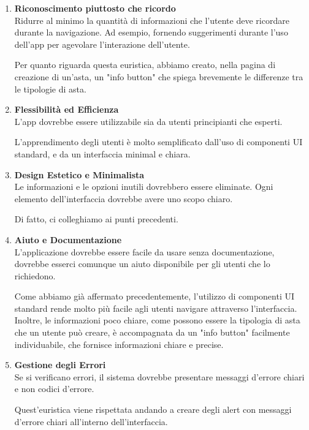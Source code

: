\begin{enumerate}
	\item \textbf{\sffamily Riconoscimento piuttosto che ricordo} \\
	      Ridurre al minimo la quantità di informazioni che l'utente deve ricordare durante la navigazione.
	      Ad esempio, fornendo suggerimenti durante l'uso dell'app per agevolare l'interazione dell'utente.

	      Per quanto riguarda questa euristica, abbiamo creato, nella pagina di creazione di un'asta, un "info button" che spiega brevemente le differenze tra le tipologie di asta.

	\item \textbf{\sffamily Flessibilità ed Efficienza} \\
	      L'app dovrebbe essere utilizzabile sia da utenti principianti che esperti.

	      L'apprendimento degli utenti è molto semplificato dall'uso di componenti UI standard, e da un interfaccia minimal e chiara.

	\item \textbf{\sffamily Design Estetico e Minimalista} \\
	      Le informazioni e le opzioni inutili dovrebbero essere eliminate.
	      Ogni elemento dell'interfaccia dovrebbe avere uno scopo chiaro.

	      Di fatto, ci colleghiamo ai punti precedenti.

	\item \textbf{\sffamily Aiuto e Documentazione} \\
	      L'applicazione dovrebbe essere facile da usare senza documentazione, dovrebbe esserci comunque un aiuto disponibile per gli utenti che lo richiedono.

	      Come abbiamo già affermato precedentemente, l'utilizzo di componenti UI standard rende molto più facile agli utenti navigare attraverso l'interfaccia.
	      Inoltre, le informazioni poco chiare, come possono essere la tipologia di asta che un utente può creare, è accompagnata da un "info button" facilmente individuabile, che fornisce informazioni chiare e precise.

	\item \textbf{\sffamily Gestione degli Errori} \\
	      Se si verificano errori, il sistema dovrebbe presentare messaggi d'errore chiari e non codici d'errore.

	      Quest'euristica viene rispettata andando a creare degli alert con messaggi d'errore chiari all'interno dell'interfaccia.
\end{enumerate}

